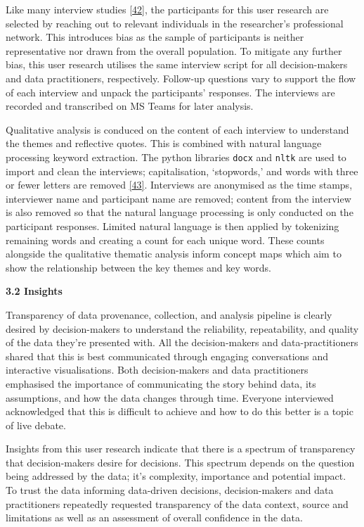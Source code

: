 \documentclass{article}
\begin{document}
Like many interview studies \protect\hyperlink{ref-futzing}{{[}42{]}},
the participants for this user research are selected by reaching out to
relevant individuals in the researcher's professional network. This
introduces bias as the sample of participants is neither representative
nor drawn from the overall population. To mitigate any further bias,
this user research utilises the same interview script for all
decision-makers and data practitioners, respectively. Follow-up
questions vary to support the flow of each interview and unpack the
participants' responses. The interviews are recorded and transcribed on
MS Teams for later analysis.

Qualitative analysis is conduced on the content of each interview to
understand the themes and reflective quotes. This is combined with
natural language processing keyword extraction. The python libraries
\texttt{docx} and \texttt{nltk} are used to import and clean the
interviews; capitalisation, `stopwords,' and words with three or fewer
letters are removed \protect\hyperlink{ref-jono}{{[}43{]}}. Interviews
are anonymised as the time stamps, interviewer name and participant name
are removed; content from the interview is also removed so that the
natural language processing is only conducted on the participant
responses. Limited natural language is then applied by tokenizing
remaining words and creating a count for each unique word. These counts
alongside the qualitative thematic analysis inform concept maps which
aim to show the relationship between the key themes and key words.

\textbf{3.2 Insights}

Transparency of data provenance, collection, and analysis pipeline is
clearly desired by decision-makers to understand the reliability,
repeatability, and quality of the data they're presented with. All the
decision-makers and data-practitioners shared that this is best
communicated through engaging conversations and interactive
visualisations. Both decision-makers and data practitioners emphasised
the importance of communicating the story behind data, its assumptions,
and how the data changes through time. Everyone interviewed acknowledged
that this is difficult to achieve and how to do this better is a topic
of live debate.

Insights from this user research indicate that there is a spectrum of
transparency that decision-makers desire for decisions. This spectrum
depends on the question being addressed by the data; it's complexity,
importance and potential impact. To trust the data informing data-driven
decisions, decision-makers and data practitioners repeatedly requested
transparency of the data context, source and limitations as well as an
assessment of overall confidence in the data.
\end{document}
